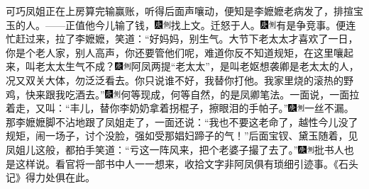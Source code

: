 可巧凤姐正在上房算完输赢账，听得后面声嚷动，便知是李嬷嬷老病发了，排揎宝玉的人。------正值他今儿输了钱，{\includegraphics[width=3mm]{../Images/00004}\includegraphics[width=3mm]{../Images/00011}\footnotesize \kaishu 找上文。}迁怒于人。{\includegraphics[width=3mm]{../Images/00004}\includegraphics[width=3mm]{../Images/00011}\footnotesize \kaishu 有是争竞事。}便连忙赶过来，拉了李嬷嬷，笑道：``好妈妈，别生气。大节下老太太才喜欢了一日，你是个老人家，别人高声，你还要管他们呢，难道你反不知道规矩，在这里嚷起来，叫老太太生气不成？{\includegraphics[width=3mm]{../Images/00004}\includegraphics[width=3mm]{../Images/00011}\footnotesize \kaishu 阿凤两提``老太太''，是叫老妪想袭卿是老太太的人，况又双关大体，勿泛泛看去。}你只说谁不好，我替你打他。我家里烧的滚热的野鸡，快来跟我吃酒去。''{\includegraphics[width=3mm]{../Images/00004}\includegraphics[width=3mm]{../Images/00011}\footnotesize \kaishu 何等现成，何等自然，的是凤卿笔法。}一面说，一面拉着走，又叫：``丰儿，替你李奶奶拿着拐棍子，擦眼泪的手帕子。''{\includegraphics[width=3mm]{../Images/00004}\includegraphics[width=3mm]{../Images/00011}\footnotesize \kaishu 一丝不漏。}那李嬷嬷脚不沾地跟了凤姐走了，一面还说：``我也不要这老命了，越性今儿没了规矩，闹一场子，讨个没脸，强如受那娼妇蹄子的气！''后面宝钗、黛玉随着，见凤姐儿这般，都拍手笑道：``亏这一阵风来，把个老婆子撮了去了。''{\includegraphics[width=3mm]{../Images/00004}\includegraphics[width=3mm]{../Images/00011}\footnotesize \kaishu 批书人也是这样说。看官将一部书中人一一想来，收拾文字非阿凤俱有琐细引迹事。《石头记》得力处俱在此。}


